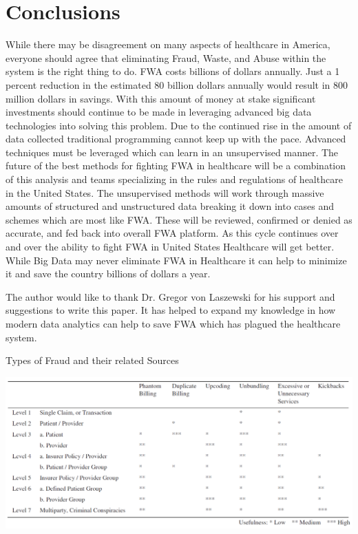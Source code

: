 \documentclass[sigconf]{acmart}
\begin{document}
\section{Conclusions}

While there may be disagreement on many aspects of healthcare in America, everyone should agree 
that eliminating Fraud, Waste, and Abuse within the system is the right thing to do.  FWA costs 
billions of dollars annually.  Just a 1 percent reduction in the estimated 80 billion dollars 
annually would result in 800 million dollars in savings.  With this amount of money at stake 
significant investments should continue to be made in leveraging advanced big data technologies 
into solving this problem.  Due to the continued rise in the amount of data collected traditional 
programming cannot keep up with the pace.  Advanced techniques must be leveraged which can learn 
in an unsupervised manner.  The future of the best methods for fighting FWA in healthcare will be 
a combination of this analysis and teams specializing in the rules and regulations of healthcare
in the United States.  The unsupervised methods will work through massive amounts of structured and 
unstructured data breaking it down into cases and schemes which are most like FWA.  These will be 
reviewed, confirmed or denied as accurate, and fed back into overall FWA platform.  As this cycle 
continues over and over the ability to fight FWA in United States Healthcare will get better.  
While Big Data may never eliminate FWA in Healthcare it can help to minimize it and save the
country billions of dollars a year.

\begin{acks}

  The author would like to thank Dr. Gregor von Laszewski for his
  support and suggestions to write this paper.  It has helped to expand my knowledge in how modern 
  data analytics can help to save FWA which has plagued the healthcare system.

\end{acks}


 

\begin{table}[htb]
    \caption{Types of Fraud and their related Sources\cite{THORNTON20131252}}
    \label{fig:TypesofFraud}
    \includegraphics[scale=0.60]{images/TypesofFraud.png}
\end{table}
\end{document}
